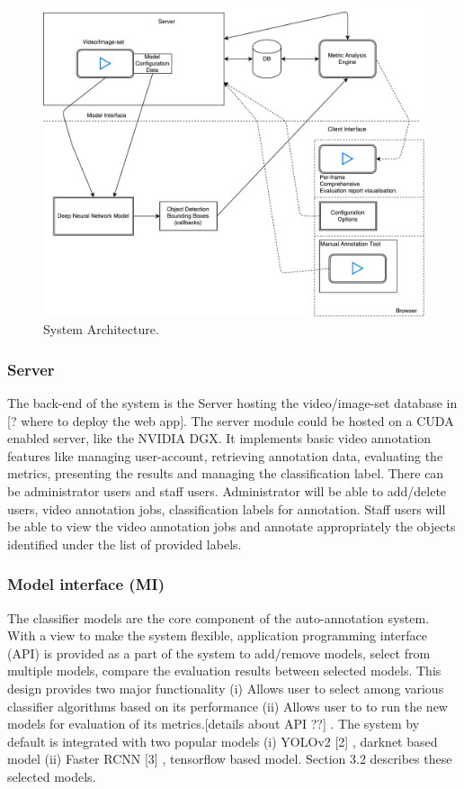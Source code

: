 \documentclass[conference]{IEEEtran}
\newcommand{\figwidthb}{0.80\linewidth}
\begin{document}
\begin{figure}[htb]
\centering
\includegraphics[width=\figwidthb]{fig/system_architecture.pdf}
\caption{System Architecture.} \label{fig.structure}
\end{figure}

\subsubsection{Server}
The back-end of the system is the Server hosting  the  video/image-set database in [? where to deploy the web app]. The server module could be hosted on a CUDA enabled server, like the NVIDIA DGX. It implements basic video annotation features like managing user-account, retrieving annotation data, evaluating the metrics, presenting the results and managing the classification label. There can be administrator users and staff users. Administrator will be able to add/delete users, video annotation jobs, classification labels for annotation. Staff users will be able to view the video annotation jobs and annotate appropriately the objects identified under the list of provided labels.
\subsubsection{Model interface (MI)}
The classifier models are the core component of the auto-annotation system. 
With a view to make the system flexible, application programming interface (API) is provided as a part of the system to add/remove models, select from multiple models, compare the  evaluation results between selected models. This design provides two major functionality (i) Allows user to select among various classifier algorithms based on its performance (ii)  Allows user to  to run the new models for evaluation of its metrics.[details about API ??] . The system by default is integrated with two popular models (i) YOLOv2 [2] , darknet based model (ii) Faster RCNN [3] , tensorflow based model. Section 3.2 describes these selected models.
\end{document}
